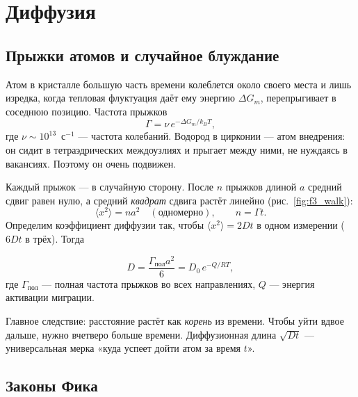 \chapter{Диффузия}

\section{Прыжки атомов и случайное блуждание}

Атом в кристалле большую часть времени колеблется около своего места и лишь изредка, когда тепловая флуктуация
даёт ему энергию $\Delta G_m$, перепрыгивает в соседнюю позицию. Частота прыжков
\begin{equation}
\Gamma = \nu\, e^{-\Delta G_m/k_BT},
\end{equation}
где $\nu\sim10^{13}$~с$^{-1}$ --- частота колебаний. Водород в цирконии --- атом внедрения: он сидит в
тетраэдрических междоузлиях и прыгает между ними, не нуждаясь в вакансиях. Поэтому он очень подвижен.

Каждый прыжок --- в случайную сторону. После $n$ прыжков длиной $a$ средний сдвиг равен нулю, а средний
\emph{квадрат} сдвига растёт линейно (рис.~\ref{fig:f3_walk}):
\begin{equation}
\langle x^2\rangle = n a^2 \quad(\text{одномерно}),\qquad n = \Gamma t .
\end{equation}
Определим коэффициент диффузии так, чтобы $\langle x^2\rangle = 2Dt$ в одном измерении ($6Dt$ в трёх). Тогда
\begin{keyf}
\[
D = \frac{\Gamma_{\text{пол}} a^2}{6} = D_0\,e^{-Q/RT},
\]
где $\Gamma_{\text{пол}}$ --- полная частота прыжков во всех направлениях, $Q$ --- энергия активации миграции.
\end{keyf}


\begin{idea}
Главное следствие: расстояние растёт как \emph{корень} из времени. Чтобы уйти вдвое дальше, нужно вчетверо
больше времени. Диффузионная длина $\sqrt{Dt}$ --- универсальная мерка «куда успеет дойти атом за время $t$».
\end{idea}

\section{Законы Фика}

